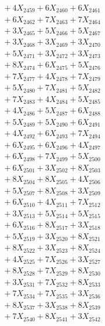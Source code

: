 \documentclass[a4paper,10pt]{article}
\begin{document}
{\begin{align}
&\;  + 4 X_{2459} + 6 X_{2460} + 6 X_{2461} \\[0.3ex]
&\;  + 6 X_{2462} + 7 X_{2463} + 7 X_{2464} \\[0.3ex]
&\;  + 3 X_{2465} + 5 X_{2466} + 5 X_{2467} \\[0.3ex]
&\;  + 3 X_{2468} + 3 X_{2469} + 3 X_{2470} \\[0.5ex]\allowbreak
&\;  + 5 X_{2471} + 3 X_{2472} + 3 X_{2473} \\[0.3ex]
&\;  + 8 X_{2474} + 6 X_{2475} + 5 X_{2476} \\[0.3ex]
&\;  + 7 X_{2477} + 4 X_{2478} + 7 X_{2479} \\[0.3ex]
&\;  + 5 X_{2480} + 7 X_{2481} + 5 X_{2482} \\[0.3ex]
&\;  + 7 X_{2483} + 4 X_{2484} + 5 X_{2485} \\[0.3ex]
&\;  + 4 X_{2486} + 5 X_{2487} + 6 X_{2488} \\[0.3ex]
&\;  + 5 X_{2489} + 5 X_{2490} + 6 X_{2491} \\[0.3ex]
&\;  + 4 X_{2492} + 6 X_{2493} + 7 X_{2494} \\[0.3ex]
&\;  + 6 X_{2495} + 6 X_{2496} + 4 X_{2497} \\[0.3ex]
&\;  + 6 X_{2498} + 7 X_{2499} + 5 X_{2500} \\[0.5ex]\allowbreak
&\;  + 6 X_{2501} + 3 X_{2502} + 8 X_{2503} \\[0.3ex]
&\;  + 8 X_{2504} + 8 X_{2505} + 4 X_{2506} \\[0.3ex]
&\;  + 5 X_{2507} + 8 X_{2508} + 3 X_{2509} \\[0.3ex]
&\;  + 6 X_{2510} + 4 X_{2511} + 7 X_{2512} \\[0.3ex]
&\;  + 3 X_{2513} + 5 X_{2514} + 5 X_{2515} \\[0.3ex]
&\;  + 6 X_{2516} + 8 X_{2517} + 3 X_{2518} \\[0.3ex]
&\;  + 5 X_{2519} + 3 X_{2520} + 8 X_{2521} \\[0.3ex]
&\;  + 8 X_{2522} + 3 X_{2523} + 8 X_{2524} \\[0.3ex]
&\;  + 4 X_{2525} + 7 X_{2526} + 3 X_{2527} \\[0.3ex]
&\;  + 8 X_{2528} + 7 X_{2529} + 8 X_{2530} \\[0.5ex]\allowbreak
&\;  + 3 X_{2531} + 7 X_{2532} + 8 X_{2533} \\[0.3ex]
&\;  + 7 X_{2534} + 7 X_{2535} + 3 X_{2536} \\[0.3ex]
&\;  + 8 X_{2537} + 3 X_{2538} + 8 X_{2539} \\[0.3ex]
&\;  + 7 X_{2540} + 8 X_{2541} + 3 X_{2542} \\[0.3ex]

\end{align}}
\end{document}
